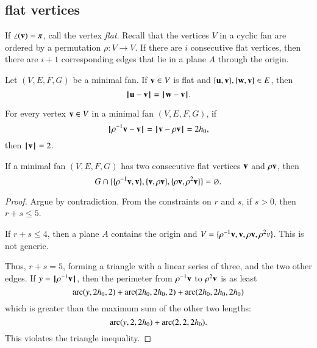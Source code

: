\subsection{flat vertices}


If $\angle(\v)=\pi$, call the vertex {\it flat}. Recall that the vertices $V$ in a cyclic fan are ordered by a permutation $\rho:V\to V$.  If there are $i$ consecutive flat vertices, then there are  $i+1$ corresponding edges that lie in a plane $A$ through the origin.  
%
%

\begin{lemma}\guid{}\rating{}
Let $(V,E,F,G)$ be a minimal fan.
If $\v\in V$ is flat and $\{\u,\v\},\{\w,\v\}\in E$, then
$$
\norm{\u}{\v} = \norm{\w}{\v}.
$$
\end{lemma}

\begin{lemma}\guid{}
For every vertex $\v\in V$ in a minimal fan $(V,E,F,G)$,
if 
$$\norm{\rho^{-1} \v}{\v}=\norm{\v}{\rho \v} = 2\hm,$$
then $\normo{\v}=2$.
\end{lemma}




\begin{lemma}\rating{}
If a minimal fan $(V,E,F,G)$ 
has two consecutive flat vertices $\v$ and $\rho \v$, then 
$$G\cap \{\{\rho^{-1}\v,\v\},\{\v,\rho \v\},\{\rho \v,\rho^2 \v\}\} = \emptyset.$$
\end{lemma}

\begin{proof}  Argue by contradiction.  From the constraints on $r$ and $s$, if $s>0$, then $r+s\le 5$. 

If $r+s\le 4$, then a plane $A$ contains the origin and $V = \{\rho^{-1}\v,\v,\rho \v,\rho^2v\}$.  This is not generic.

Thus, $r+s=5$, forming a triangle with a linear series of three, and the two other edges.  If $y=\normo{\rho^{-1} \v}$, then the perimeter from $\rho^{-1}\v$ to $\rho^2 \v$ is as least
$$
\arc(y,2\hm,2)+\arc(2\hm,2\hm,2) +\arc(2\hm,2\hm,2\hm)
$$
which is greater than the maximum sum of the other two lengths:
$$
\arc(y,2,2\hm)+\arc(2,2,2\hm).
$$
This violates the triangle inequality.
\end{proof}



